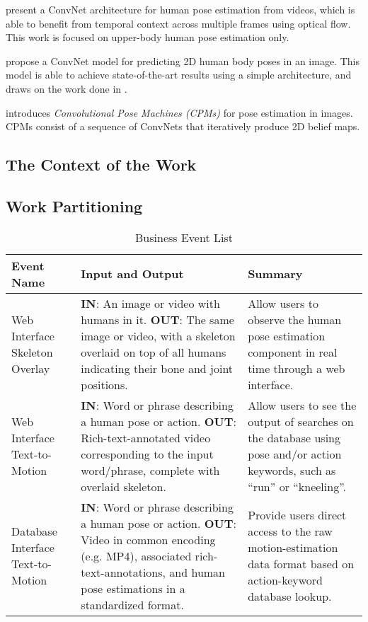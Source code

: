 \documentclass{scrreprt}
\begin{document}
\cite{DBLP:journals/corr/PfisterCZ15} present a ConvNet architecture for human
pose estimation from videos, which is able to benefit from temporal context
across multiple frames using optical flow. This work is focused on upper-body
human pose estimation only.

\cite{DBLP:journals/corr/BelagiannisZ16} propose a ConvNet model for predicting
2D human body poses in an image. This model is able to achieve state-of-the-art
results using a simple architecture, and draws on the work done in
\cite{DBLP:journals/corr/PfisterCZ15}.

\cite{DBLP:journals/corr/WeiRKS16} introduces \textit{Convolutional Pose
Machines (CPMs)} for pose estimation in images. CPMs consist of a sequence of
ConvNets that iteratively produce 2D belief maps.

\subsection{The Context of the Work}

\subsection{Work Partitioning}

\begin{table}
\caption{Business Event List}
\begin{center}
    \begin{tabular}{ | p{5cm} | p{5cm} | p{5cm} |}
    \hline
    Event Name & Input and Output & Summary \\
    \hline
    Web Interface Skeleton Overlay
            & \textbf{IN}: An image or video with humans in it.\newline
            \textbf{OUT}: The same image or video, with a skeleton overlaid on
            top of all humans indicating their bone and joint positions.
            & Allow users to observe the human pose estimation component in
            real time through a web interface.\\
    Web Interface Text-to-Motion
            & \textbf{IN}: Word or phrase describing a human pose or action.\newline
            \textbf{OUT}: Rich-text-annotated video corresponding to the input
            word/phrase, complete with overlaid skeleton.
            & Allow users to see the output of searches on the database using
            pose and/or action keywords, such as ``run'' or ``kneeling''.\\
    Database Interface Text-to-Motion
            & \textbf{IN}: Word or phrase describing a human pose or action.\newline
            \textbf{OUT}: Video in common encoding (e.g. MP4), associated
            rich-text-annotations, and human pose estimations in a standardized
            format.
            & Provide users direct access to the raw motion-estimation data
            format based on action-keyword database lookup.\\
    \hline
    \end{tabular}
\end{center}
\end{table}
\end{document}

